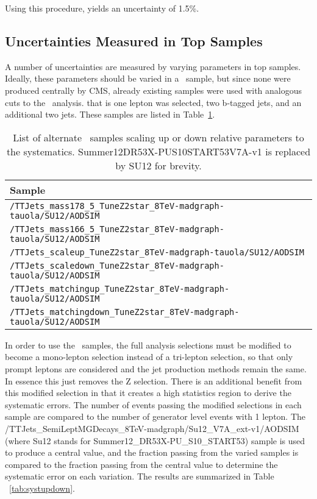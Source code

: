 Using this procedure, yields an uncertainty of 1.5\%.



\subsection{Uncertainties Measured in Top Samples}
A number of uncertainties are measured by varying parameters in top samples. Ideally, these parameters should be varied in a \ttZ \ sample, but since none were produced centrally by CMS, already existing \ttbar samples were used with analogous cuts to the \ttZ \ analysis. that is one lepton was selected, two b-tagged jets, and an additional two jets. These samples are listed in Table~\ref{tab:sampleupdown}.

\begin{table}[h]
\caption{\label{tab:sampleupdown} List of alternate \ttbar \ samples scaling up or down relative parameters to the systematics. Summer12\textunderscore DR53X-PU\textunderscore S10\textunderscore START53\textunderscore V7A-v1 is replaced by SU12 for brevity.}
\begin{center}
\begin{tabular}{l}\hline
Sample   \\ \hline
 \verb=/TTJets_mass178_5_TuneZ2star_8TeV-madgraph-tauola/SU12/AODSIM=   \\
 \verb=/TTJets_mass166_5_TuneZ2star_8TeV-madgraph-tauola/SU12/AODSIM=   \\  %
 \verb=/TTJets_scaleup_TuneZ2star_8TeV-madgraph-tauola/SU12/AODSIM=  \\
 \verb=/TTJets_scaledown_TuneZ2star_8TeV-madgraph-tauola/SU12/AODSIM=  \\ %
 \verb=/TTJets_matchingup_TuneZ2star_8TeV-madgraph-tauola/SU12/AODSIM=  \\
 \verb=/TTJets_matchingdown_TuneZ2star_8TeV-madgraph-tauola/SU12/AODSIM=  \\
\hline
\end{tabular}
\end{center}
\end{table}

In order to use the \ttbar \ samples, the full analysis selections must be modified to become a mono-lepton selection instead of a tri-lepton selection, so that only prompt leptons are considered and the jet production methods remain the same. In essence this just removes the Z selection. There is an additional benefit from this modified selection in that it creates a high statistics region to derive the systematic errors. The number of events passing the modified selections in each sample are compared to the number of generator level events with 1 lepton. The /TTJets\_SemiLeptMGDecays\_8TeV-madgraph/Su12\_V7A\_ext-v1/AODSIM  (where Su12 stands for Summer12\_DR53X-PU\_S10\_START53) sample is used to produce a central value, and the fraction passing from the varied samples is compared to the fraction passing from the central value to determine the systematic error on each variation. The results are summarized in Table ~\ref{tab:systupdown}.

